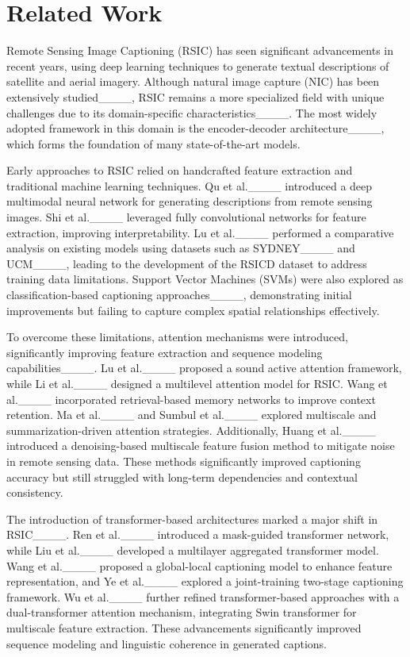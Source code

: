 \section{Related Work}
\label{sec:rel_work}
Remote Sensing Image Captioning (RSIC) has seen significant advancements in recent years, using deep learning techniques to generate textual descriptions of satellite and aerial imagery. Although natural image capture (NIC) has been extensively studied____, RSIC remains a more specialized field with unique challenges due to its domain-specific characteristics____. The most widely adopted framework in this domain is the encoder-decoder architecture____, which forms the foundation of many state-of-the-art models.

Early approaches to RSIC relied on handcrafted feature extraction and traditional machine learning techniques. Qu et al.____ introduced a deep multimodal neural network for generating descriptions from remote sensing images. Shi et al.____ leveraged fully convolutional networks for feature extraction, improving interpretability. Lu et al.____ performed a comparative analysis on existing models using datasets such as SYDNEY____ and UCM____, leading to the development of the RSICD dataset to address training data limitations. Support Vector Machines (SVMs) were also explored as classification-based captioning approaches____, demonstrating initial improvements but failing to capture complex spatial relationships effectively.

To overcome these limitations, attention mechanisms were introduced, significantly improving feature extraction and sequence modeling capabilities____. Lu et al.____ proposed a sound active attention framework, while Li et al.____ designed a multilevel attention model for RSIC. Wang et al.____ incorporated retrieval-based memory networks to improve context retention. Ma et al.____ and Sumbul et al.____ explored multiscale and summarization-driven attention strategies. Additionally, Huang et al.____ introduced a denoising-based multiscale feature fusion method to mitigate noise in remote sensing data. These methods significantly improved captioning accuracy but still struggled with long-term dependencies and contextual consistency.

The introduction of transformer-based architectures marked a major shift in RSIC____. Ren et al.____ introduced a mask-guided transformer network, while Liu et al.____ developed a multilayer aggregated transformer model. Wang et al.____ proposed a global-local captioning model to enhance feature representation, and Ye et al.____ explored a joint-training two-stage captioning framework. Wu et al.____ further refined transformer-based approaches with a dual-transformer attention mechanism, integrating Swin transformer for multiscale feature extraction. These advancements significantly improved sequence modeling and linguistic coherence in generated captions.

